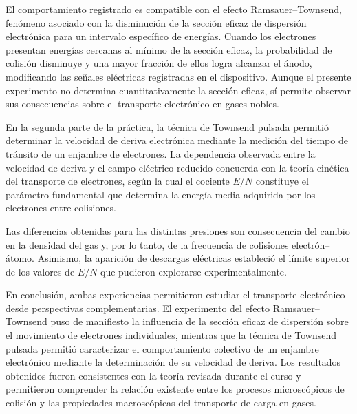 \documentclass{article}
\begin{document}
El comportamiento registrado es compatible con el efecto Ramsauer--Townsend, fenómeno asociado con la disminución de la sección eficaz de dispersión electrónica para un intervalo específico de energías. Cuando los electrones presentan energías cercanas al mínimo de la sección eficaz, la probabilidad de colisión disminuye y una mayor fracción de ellos logra alcanzar el ánodo, modificando las señales eléctricas registradas en el dispositivo. Aunque el presente experimento no determina cuantitativamente la sección eficaz, sí permite observar sus consecuencias sobre el transporte electrónico en gases nobles.

En la segunda parte de la práctica, la técnica de Townsend pulsada permitió determinar la velocidad de deriva electrónica mediante la medición del tiempo de tránsito de un enjambre de electrones. La dependencia observada entre la velocidad de deriva y el campo eléctrico reducido concuerda con la teoría cinética del transporte de electrones, según la cual el cociente $E/N$ constituye el parámetro fundamental que determina la energía media adquirida por los electrones entre colisiones.

Las diferencias obtenidas para las distintas presiones son consecuencia del cambio en la densidad del gas y, por lo tanto, de la frecuencia de colisiones electrón--átomo. Asimismo, la aparición de descargas eléctricas estableció el límite superior de los valores de $E/N$ que pudieron explorarse experimentalmente.

En conclusión, ambas experiencias permitieron estudiar el transporte electrónico desde perspectivas complementarias. El experimento del efecto Ramsauer--Townsend puso de manifiesto la influencia de la sección eficaz de dispersión sobre el movimiento de electrones individuales, mientras que la técnica de Townsend pulsada permitió caracterizar el comportamiento colectivo de un enjambre electrónico mediante la determinación de su velocidad de deriva. Los resultados obtenidos fueron consistentes con la teoría revisada durante el curso y permitieron comprender la relación existente entre los procesos microscópicos de colisión y las propiedades macroscópicas del transporte de carga en gases.
\end{document}
